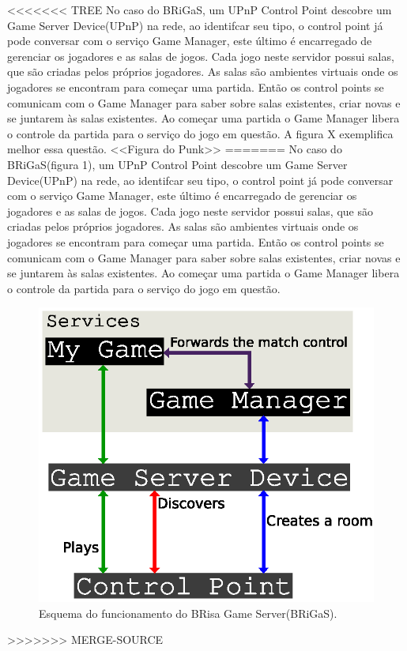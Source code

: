 \documentclass[a4paper]{sbgames}               %
\begin{document}
<<<<<<< TREE
No caso do BRiGaS, um UPnP Control Point descobre um Game Server Device(UPnP) na rede, ao identifcar seu tipo, o control point já pode conversar com o serviço Game Manager, este último é encarregado de gerenciar os jogadores e as salas de jogos. Cada jogo neste servidor possui salas, que são criadas pelos próprios jogadores. As salas são ambientes virtuais onde os jogadores se encontram para começar uma partida. Então os control points se comunicam com o Game Manager para saber sobre salas existentes, criar novas e se juntarem às salas existentes. Ao começar uma partida o Game Manager libera o controle da partida para o serviço do jogo em questão. A figura X exemplifica melhor essa questão.
<<Figura do Punk>>
=======
No caso do BRiGaS(figura 1), um UPnP Control Point descobre um Game Server Device(UPnP) na rede, ao identifcar seu tipo, o control point já pode conversar com o serviço Game Manager, este último é encarregado de gerenciar os jogadores e as salas de jogos. Cada jogo neste servidor possui salas, que são criadas pelos próprios jogadores. As salas são ambientes virtuais onde os jogadores se encontram para começar uma partida. Então os control points se comunicam com o Game Manager para saber sobre salas existentes, criar novas e se juntarem às salas existentes. Ao começar uma partida o Game Manager libera o controle da partida para o serviço do jogo em questão.

\begin{figure}[h!]
    \centering
    \includegraphics[scale=0.80]{images/game-server-fluxo.eps}
    \caption{Esquema do funcionamento do BRisa Game Server(BRiGaS).}
    \label{fig:avschema_new}
\vspace{-5mm}
\end{figure}
\vspace{3mm}
\normalsize
>>>>>>> MERGE-SOURCE
\end{document}
